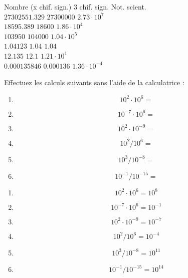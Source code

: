 \documentclass[
  11pt,
  a4paper,
  openany]{book}
\providecommand{\tightlist}{%
  \setlength{\itemsep}{0pt}\setlength{\parskip}{0pt}}
\begin{document}
\begin{Answer}
Nombre (x chif. sign.) \tabto{11em} \textbar{} 3 chif. sign. \tabto{20em} \textbar{} Not. scient.\\
\(27302551.329\) \tabto{11em} \textbar{} \(27300000\) \tabto{20em} \textbar{} \(2.73 \cdot 10^7\)\\
\(18595.389\) \tabto{11em} \textbar{} \(18600\) \tabto{20em} \textbar{} \(1.86 \cdot 10^4\)\\
\(103950\) \tabto{11em} \textbar{} \(104000\) \tabto{20em} \textbar{} \(1.04 \cdot 10^5\)\\
\(1.04123\) \tabto{11em} \textbar{} \(1.04\) \tabto{20em} \textbar{} \(1.04\)\\
\(12.135\) \tabto{11em} \textbar{} \(12.1\) \tabto{20em} \textbar{} \(1.21 \cdot 10^1\)\\
\(0.000135846\) \tabto{11em} \textbar{} \(0.000136\) \tabto{20em} \textbar{} \(1.36 \cdot 10^{-4}\)

\end{Answer}

\begin{Exercise}

Effectuez les calculs suivants sans l'aide de la calculatrice :

\begin{multicols}{2}

\begin{enumerate}
\def\labelenumi{\alph{enumi}.}
\tightlist
\item
  \[10^2 \cdot 10^6 = \]
\item
  \[10^{-7} \cdot 10^6 = \]
\item
  \[10^2 \cdot 10^{-9} = \]
\item
  \[10^2 / 10^6 = \]
\item
  \[10^3 / 10^{-8} = \]
\item
  \[10^{-1} / 10^{-15} = \]
\end{enumerate}

\end{multicols}

\end{Exercise}

\begin{Answer}

\begin{multicols}{2}

\begin{enumerate}
\def\labelenumi{\alph{enumi}.}
\tightlist
\item
  \[10^2 \cdot 10^6 = 10^8 \]
\item
  \[10^{-7} \cdot 10^6 = 10^{-1} \]
\item
  \[10^2 \cdot 10^{-9} = 10^{-7} \]
\item
  \[10^2 / 10^6 = 10^{-4} \]
\item
  \[10^3 / 10^{-8} = 10^{11} \]
\item
  \[10^{-1} / 10^{-15} = 10^{14} \]
\end{enumerate}

\end{multicols}

\end{Answer}
\end{document}

